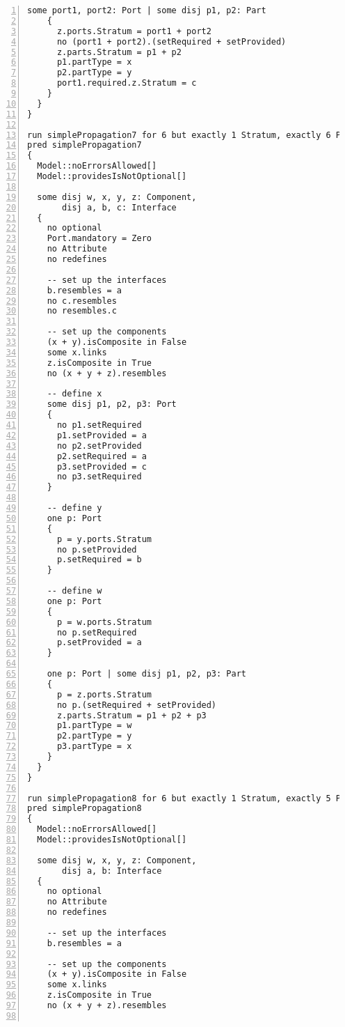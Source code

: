\begin{lstlisting}[caption={unittests\_inference.als}, numbers=left]
    some port1, port2: Port | some disj p1, p2: Part
    {
      z.ports.Stratum = port1 + port2
      no (port1 + port2).(setRequired + setProvided)
      z.parts.Stratum = p1 + p2
      p1.partType = x
      p2.partType = y
      port1.required.z.Stratum = c
    }
  }
}

run simplePropagation7 for 6 but exactly 1 Stratum, exactly 6 Port, exactly 3 Part, exactly 4 Component, exactly 3 Interface, exactly 7 Element, 4 Connector, 11 LinkEnd, 8 ConnectorEnd
pred simplePropagation7
{
  Model::noErrorsAllowed[]
  Model::providesIsNotOptional[]

  some disj w, x, y, z: Component,
       disj a, b, c: Interface
  {
    no optional
    Port.mandatory = Zero
    no Attribute
    no redefines
  
    -- set up the interfaces
    b.resembles = a
    no c.resembles
    no resembles.c
  
    -- set up the components
    (x + y).isComposite in False
    some x.links
    z.isComposite in True
    no (x + y + z).resembles
    
    -- define x
    some disj p1, p2, p3: Port
    {
      no p1.setRequired
      p1.setProvided = a
      no p2.setProvided
      p2.setRequired = a
      p3.setProvided = c
      no p3.setRequired
    }
    
    -- define y
    one p: Port
    {
      p = y.ports.Stratum
      no p.setProvided
      p.setRequired = b
    }
    
    -- define w
    one p: Port
    {
      p = w.ports.Stratum
      no p.setRequired
      p.setProvided = a
    }
    
    one p: Port | some disj p1, p2, p3: Part
    {
      p = z.ports.Stratum
      no p.(setRequired + setProvided)
      z.parts.Stratum = p1 + p2 + p3
      p1.partType = w
      p2.partType = y
      p3.partType = x
    }
  }
}

run simplePropagation8 for 6 but exactly 1 Stratum, exactly 5 Port, exactly 3 Part, exactly 4 Component, exactly 2 Interface, exactly 6 Element, 3 Connector, 9 LinkEnd, 6 ConnectorEnd
pred simplePropagation8
{
  Model::noErrorsAllowed[]
  Model::providesIsNotOptional[]

  some disj w, x, y, z: Component,
       disj a, b: Interface
  {
    no optional
    no Attribute
    no redefines
  
    -- set up the interfaces
    b.resembles = a
  
    -- set up the components
    (x + y).isComposite in False
    some x.links
    z.isComposite in True
    no (x + y + z).resembles
    

\end{lstlisting}
